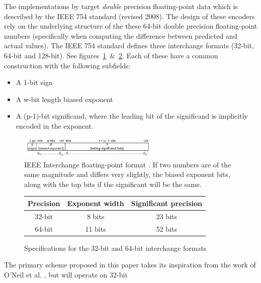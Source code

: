 The implementations by \cite{O'Neil:2011:FDC:1964179.1964189,1607248,4589203,4976448,engelson2000lossless} target \textit{double} precision floating-point data which is described by the IEEE 754 standard (revised 2008).
The design of these encoders rely on the underlying structure of the these 64-bit double precision floating-point numbers (specifically when computing the difference between predicted and actual values). The IEEE 754 standard defines three 
interchange formats (32-bit, 64-bit and 128-bit). See figures~\ref{IEEE_FLOAT}~\&~\ref{IEEE_FLOAT_TAB}. Each of these have a common construction with the following subfields:
\begin{itemize}
 \item A 1-bit sign
 \item A w-bit length biased exponent
 \item A (p-1)-bit significand, where the leading bit of the significand is implicitly encoded in the exponent.
\end{itemize}
\begin{figure}[h!]
  \begin{mdframed}
  \centering
  \includegraphics[width=0.6\textwidth]{IEEEinterchangeFormat.png}
  \caption{IEEE Interchange floating-point format \cite{4610935}. If two numbers are of the same magnitude and differs very slightly, the biased exponent bits, along with the
  top bits if the significant will be the same.}
  \label{IEEE_FLOAT}
  \end{mdframed}
\end{figure}
\begin{figure}[h!]
\begin{mdframed}
\centering
\begin{tabular}{|c|c|c|}
 \hline
 Precision & Exponent width & Significant precision \\
 \hline
 32-bit & 8 bits & 23 bits \\
 \hline
 64-bit & 11 bits & 52 bits \\
 \hline
\end{tabular}
\caption{Specifications for the 32-bit and 64-bit interchange formats}
 \label{IEEE_FLOAT_TAB}
\end{mdframed}
\end{figure}
The primary scheme proposed in this paper takes its inspiration from the work of O'Neil et al. \cite{O'Neil:2011:FDC:1964179.1964189}, but will operate on 32-bit 
